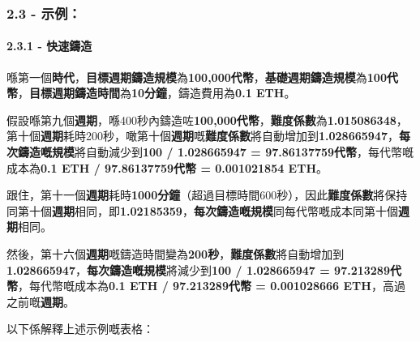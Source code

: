 \documentclass[
]{article}
\begin{document}
\subsubsection{2.3 - 示例：}\label{ux793aux4f8b}

\paragraph{2.3.1 - 快速鑄造}\label{ux5febux901fux9444ux9020}

喺第一個\textbf{時代}，\textbf{目標週期鑄造規模}為\textbf{100,000代幣}，\textbf{基礎週期鑄造規模}為\textbf{100代幣}，\textbf{目標週期鑄造時間}為\textbf{10分鐘}，鑄造費用為\textbf{0.1
ETH}。

假設喺第九個\textbf{週期}，喺400秒內鑄造咗\textbf{100,000代幣}，\textbf{難度係數}為\textbf{1.015086348}，第十個\textbf{週期}耗時200秒，噉第十個\textbf{週期}嘅\textbf{難度係數}將自動增加到\textbf{1.028665947}，\textbf{每次鑄造嘅規模}將自動減少到\textbf{100
/ 1.028665947 = 97.86137759代幣}，每代幣嘅成本為\textbf{0.1 ETH /
97.86137759代幣 = 0.001021854 ETH}。

跟住，第十一個\textbf{週期}耗時\textbf{1000分鐘}（超過目標時間600秒），因此\textbf{難度係數}將保持同第十個\textbf{週期}相同，即\textbf{1.02185359}，\textbf{每次鑄造嘅規模}同每代幣嘅成本同第十個\textbf{週期}相同。

然後，第十六個\textbf{週期}嘅鑄造時間變為\textbf{200秒}，\textbf{難度係數}將自動增加到\textbf{1.028665947}，\textbf{每次鑄造嘅規模}將減少到\textbf{100
/ 1.028665947 = 97.213289代幣}，每代幣嘅成本為\textbf{0.1 ETH /
97.213289代幣 = 0.001028666 ETH}，高過之前嘅\textbf{週期}。

以下係解釋上述示例嘅表格：
\end{document}
